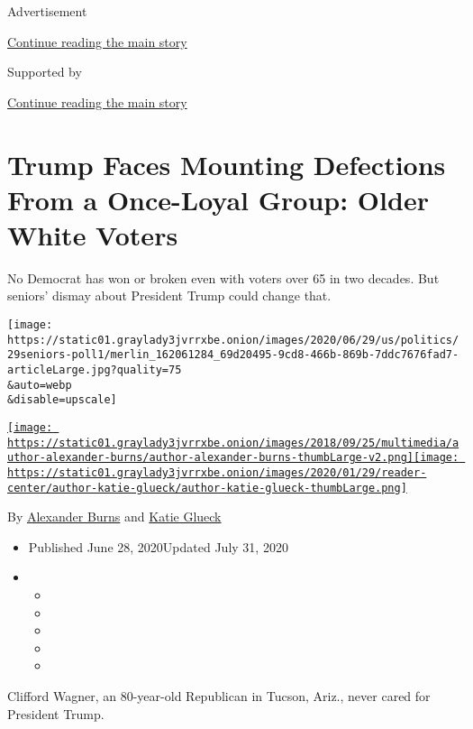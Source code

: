 Advertisement

\protect\hyperlink{after-top}{Continue reading the main story}

Supported by

\protect\hyperlink{after-sponsor}{Continue reading the main story}

\hypertarget{trump-faces-mounting-defections-from-a-once-loyal-group-older-white-voters}{%
\section{Trump Faces Mounting Defections From a Once-Loyal Group: Older
White
Voters}\label{trump-faces-mounting-defections-from-a-once-loyal-group-older-white-voters}}

No Democrat has won or broken even with voters over 65 in two decades.
But seniors' dismay about President Trump could change that.

\texttt{[image: https://static01.graylady3jvrrxbe.onion/images/2020/06/29/us/politics/29seniors-poll1/merlin\_162061284\_69d20495-9cd8-466b-869b-7ddc7676fad7-articleLarge.jpg?quality=75\\\&auto=webp\\\&disable=upscale]}

\href{https://www.nytimes3xbfgragh.onion/by/alexander-burns}{\texttt{[image: https://static01.graylady3jvrrxbe.onion/images/2018/09/25/multimedia/author-alexander-burns/author-alexander-burns-thumbLarge-v2.png]}}\href{https://www.nytimes3xbfgragh.onion/by/katie-glueck}{\texttt{[image: https://static01.graylady3jvrrxbe.onion/images/2020/01/29/reader-center/author-katie-glueck/author-katie-glueck-thumbLarge.png]}}

By
\href{https://www.nytimes3xbfgragh.onion/by/alexander-burns}{Alexander
Burns} and
\href{https://www.nytimes3xbfgragh.onion/by/katie-glueck}{Katie Glueck}

\begin{itemize}
\item
  Published June 28, 2020Updated July 31, 2020
\item
  \begin{itemize}
  \item
  \item
  \item
  \item
  \item
  \end{itemize}
\end{itemize}

Clifford Wagner, an 80-year-old Republican in Tucson, Ariz., never cared
for President Trump.

